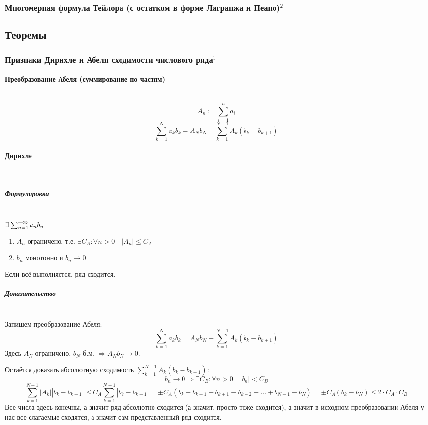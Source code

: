 \documentclass{article}
\def\letus{%
\mathord{\setbox0=\hbox{$\exists$}%
         \hbox{\kern 0.125\wd0%
               \vbox to \ht0{%
                  \hrule width 0.75\wd0%
                  \vfill%
                  \hrule width 0.75\wd0}%
               \vrule height \ht0%
               \kern 0.125\wd0}%
       }%
        }
\let\vanillaparagraph\paragraph
\let\vanillasubparagraph\subparagraph
\renewcommand{\paragraph}[1]{\vanillaparagraph{#1}\mbox{}\\}
\renewcommand{\subparagraph}[1]{\vanillasubparagraph{#1}\mbox{}\\}
\begin{document}
\subsubsection{Многомерная формула Тейлора (с остатком в форме Лагранжа и Пеано)\texorpdfstring{$^2$}{}}



\newpage
\subsection{Теоремы}

\subsubsection{Признаки Дирихле и Абеля сходимости числового ряда\texorpdfstring{$^1$}{}}
\paragraph{Преобразование Абеля (суммирование по частям)}
$$
A_n := \sum_{i=1}^n a_i
$$
$$
\sum_{k=1}^N a_k b_k = A_N b_N + \sum_{k=1}^{N-1} A_k (b_k - b_{k+1})
$$

\paragraph{Дирихле}
\subparagraph{Формулировка}
$\letus \sum_{n=1}^{+\infty} a_n b_n$
\begin{enumerate}
    \item $A_n$ ограничено, т.е. $\exists C_A : \forall n > 0 \quad |A_n| \le C_A$
    \item $b_n$ монотонно и $b_n \rightarrow 0$
\end{enumerate}
Если всё выполняется, ряд сходится. 

\subparagraph{Доказательство}
Запишем преобразование Абеля:
$$
\sum_{k=1}^N a_k b_k = A_N b_N + \sum_{k=1}^{N-1} A_k (b_k - b_{k+1})
$$
Здесь $A_N$ ограничено, $b_N$ б.м. $\Rightarrow A_N b_N \rightarrow 0$.

Остаётся доказать абсолютную сходимость $\sum_{k=1}^{N-1} A_k (b_k - b_{k+1})$:
$$
b_n \rightarrow 0 \Rightarrow \exists C_B : \forall n > 0 \quad |b_n| < C_B
$$
$$
\sum_{k=1}^{N-1} |A_k| |b_k - b_{k+1}| \le C_A \sum_{k=1}^{N-1} |b_k - b_{k+1}| = \pm C_A (b_k - b_{k+1} + b_{k+1} - b_{k+2} + \ldots + b_{N-1} - b_N) = \pm C_A (b_k - b_N) \le 2 \cdot C_A \cdot C_B
$$
Все числа здесь конечны, а значит ряд абсолютно сходится (а значит, просто тоже сходится), а значит в исходном преобразовании Абеля у нас все слагаемые сходятся, а значит сам представленный ряд сходится. 
\end{document}
